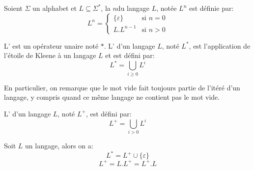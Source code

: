 \begin{definition}
    Soient \( \Sigma \) un alphabet et \( L \subseteq \Sigma^* \), la  \( n \)\ieme du langage \( L \), notée \( L^n \) est définie par:
    \[
      L^n =
      \begin{cases}
        \{ \varepsilon \} & \text{si $n = 0$} \\
        L . L^{n-1}       & \text{si $n > 0$}
      \end{cases}
    \]
\end{definition}


\begin{definition}
    L' est un opérateur unaire noté \( * \). L' d'un langage \( L \), noté \( L^* \), est l'application de l'étoile de Kleene à un langage \( L \) et est défini par:
    \begin{equation}
        L^* = \bigcup_{i \geq 0} L^i
    \end{equation}
\end{definition}

En particulier, on remarque que le mot vide fait toujours partie de l'itéré d'un langage, y compris quand ce même langage ne contient pas le mot vide.

\begin{definition}
  L' d'un langage \( L \), noté \( L^+ \), est défini par:
    \begin{equation}
        L^+ = \bigcup_{i > 0} L^i
    \end{equation}
\end{definition}

\begin{proposition}
  Soit \( L \) un langage, alors on a:
  \begin{equation}
    L^* = L^+ \cup \{ \varepsilon \}
  \end{equation}
  \begin{equation}
    L^+ = L.L^+ = L^+.L
  \end{equation}
\end{proposition}

